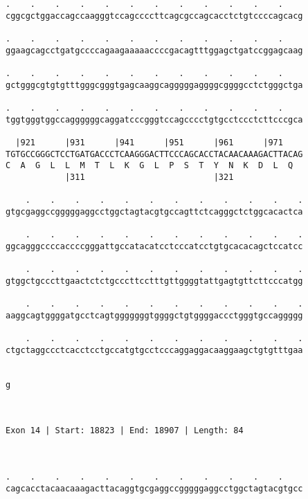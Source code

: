 \documentclass{article}
\begin{document}
\begin{Verbatim}
.    .    .    .    .    .    .    .    .    .    .    .    
cggcgctggaccagccaagggtccagccccttcagcgccagcacctctgtccccagcacg
                                                            
.    .    .    .    .    .    .    .    .    .    .    .    
ggaagcagcctgatgccccagaagaaaaaccccgacagtttggagctgatccggagcaag
                                                            
.    .    .    .    .    .    .    .    .    .    .    .    
gctgggcgtgtgtttgggcgggtgagcaaggcagggggaggggcggggcctctgggctga
                                                            
.    .    .    .    .    .    .    .    .    .    .    .    
tggtgggtggccaggggggcaggatcccgggtccagcccctgtgcctccctcttcccgca
                                                            
  |921      |931      |941      |951      |961      |971    
TGTGCCGGGCTCCTGATGACCCTCAAGGGACTTCCCAGCACCTACAACAAAGACTTACAG
C  A  G  L  L  M  T  L  K  G  L  P  S  T  Y  N  K  D  L  Q  
            |311                          |321              
  
    .    .    .    .    .    .    .    .    .    .    .    .
gtgcgaggccgggggaggcctggctagtacgtgccagttctcagggctctggcacactca
                                                            
    .    .    .    .    .    .    .    .    .    .    .    .
ggcagggccccaccccgggattgccatacatcctcccatcctgtgcacacagctccatcc
                                                            
    .    .    .    .    .    .    .    .    .    .    .    .
gtggctgcccttgaactctctgcccttcctttgttggggtattgagtgttcttcccatgg
                                                            
    .    .    .    .    .    .    .    .    .    .    .    .
aaggcagtggggatgcctcagtgggggggtggggctgtggggaccctgggtgccaggggg
                                                            
    .    .    .    .    .    .    .    .    .    .    .    .
ctgctaggccctcacctcctgccatgtgcctcccaggaggacaaggaagctgtgtttgaa
                                                            
 
g
 
 
 
Exon 14 | Start: 18823 | End: 18907 | Length: 84



.    .    .    .    .    .    .    .    .    .    .    .    
cagcacctacaacaaagacttacaggtgcgaggccgggggaggcctggctagtacgtgcc
                                                            

\end{Verbatim}
\end{document}
